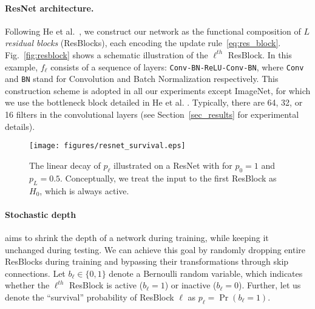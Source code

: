 \documentclass[runningheads]{llncs}
\begin{document}
\paragraph{\textbf{ResNet architecture.}}
Following He et al.~\cite{he2015deep}, we construct our network as the functional composition of $L$ \emph{residual blocks} (ResBlocks), each encoding the update rule~\eqref{eq:res_block}.  Fig.~\ref{fig:resblock} shows a schematic illustration of the $\ell^{th}$ ResBlock. In this example, $f_\ell$ consists of a sequence of layers: {\tt Conv-BN-ReLU-Conv-BN}, where {\tt Conv} and {\tt BN} stand for Convolution and Batch Normalization respectively.
This construction scheme is adopted in all our experiments except ImageNet, for which we use the bottleneck block detailed in He et al. \cite{he2015deep}. Typically, there are 64, 32, or 16 filters in the convolutional layers (see Section~\ref{sec_results} for experimental details).

\begin{figure*}[t]
	\begin{center}
		\vspace{-2ex}
		\centerline{\texttt{[image: figures/resnet\_survival.eps]}}
		\caption{The linear decay of $p_\ell$ illustrated on a ResNet with \name{} for $p_0\!=\!1$ and $p_L\!=\! 0.5$. Conceptually, we treat the input to the first ResBlock as $H_0$, which is always active.}
    \label{figure.lin_decay}
		\vspace{-6ex}
	\end{center}
\end{figure*}

\paragraph{\textbf{Stochastic depth}} aims to shrink the depth of a network during training, while keeping it unchanged during testing. We can achieve this goal by randomly dropping entire ResBlocks during training and bypassing their transformations through skip connections.
Let $b_\ell\in\{0,1\}$ denote a Bernoulli random variable, which indicates whether the $\ell^{th}$ ResBlock is active ($b_\ell=1$) or inactive ($b_\ell=0$). Further, let us denote the ``survival'' probability of ResBlock $\ell$ as $p_\ell=\Pr(b_\ell=1)$.
\end{document}
